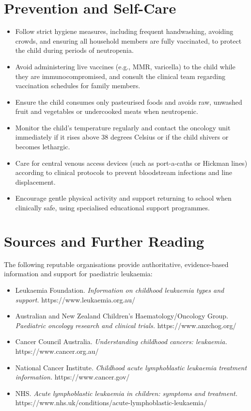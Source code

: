 \section*{Prevention and Self-Care}
\begin{itemize}
    \item Follow strict hygiene measures, including frequent handwashing, avoiding crowds, and ensuring all household members are fully vaccinated, to protect the child during periods of neutropenia.
    \item Avoid administering live vaccines (e.g., MMR, varicella) to the child while they are immunocompromised, and consult the clinical team regarding vaccination schedules for family members.
    \item Ensure the child consumes only pasteurised foods and avoids raw, unwashed fruit and vegetables or undercooked meats when neutropenic.
    \item Monitor the child's temperature regularly and contact the oncology unit immediately if it rises above 38 degrees Celsius or if the child shivers or becomes lethargic.
    \item Care for central venous access devices (such as port-a-caths or Hickman lines) according to clinical protocols to prevent bloodstream infections and line displacement.
    \item Encourage gentle physical activity and support returning to school when clinically safe, using specialised educational support programmes.
\end{itemize}

\section*{Sources and Further Reading}
The following reputable organisations provide authoritative, evidence-based information and support for paediatric leukaemia:
\begin{itemize}
    \item Leukaemia Foundation. \textit{Information on childhood leukaemia types and support.} https://www.leukaemia.org.au/
    \item Australian and New Zealand Children's Haematology/Oncology Group. \textit{Paediatric oncology research and clinical trials.} https://www.anzchog.org/
    \item Cancer Council Australia. \textit{Understanding childhood cancers: leukaemia.} https://www.cancer.org.au/
    \item National Cancer Institute. \textit{Childhood acute lymphoblastic leukaemia treatment information.} https://www.cancer.gov/
    \item NHS. \textit{Acute lymphoblastic leukaemia in children: symptoms and treatment.} https://www.nhs.uk/conditions/acute-lymphoblastic-leukaemia/
\end{itemize}
